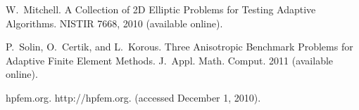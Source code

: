 
\begin{thebibliography}{10}

{\sc W.~Mitchell}. {A Collection of 2D Elliptic Problems for
Testing Adaptive Algorithms}. NISTIR 7668, 2010 (available online).

{\sc P.~Solin, O.~Certik, and L.~Korous}. {Three Anisotropic Benchmark Problems
for Adaptive Finite Element Methods}. J.~Appl. Math. Comput. 2011 (available online).

{\sc hpfem.org}. {http://hpfem.org}. (accessed December 1, 2010).

\end{thebibliography}